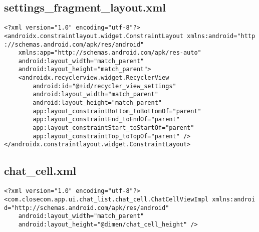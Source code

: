 \documentclass[listing]{espd}
\begin{document}
\subsection{settings\_fragment\_layout.xml}
\begin{verbatim}
<?xml version="1.0" encoding="utf-8"?>
<androidx.constraintlayout.widget.ConstraintLayout xmlns:android="http
://schemas.android.com/apk/res/android"
    xmlns:app="http://schemas.android.com/apk/res-auto"
    android:layout_width="match_parent"
    android:layout_height="match_parent">
    <androidx.recyclerview.widget.RecyclerView
        android:id="@+id/recycler_view_settings"
        android:layout_width="match_parent"
        android:layout_height="match_parent"
        app:layout_constraintBottom_toBottomOf="parent"
        app:layout_constraintEnd_toEndOf="parent"
        app:layout_constraintStart_toStartOf="parent"
        app:layout_constraintTop_toTopOf="parent" />
</androidx.constraintlayout.widget.ConstraintLayout>
\end{verbatim}

\subsection{chat\_cell.xml}
\begin{verbatim}
<?xml version="1.0" encoding="utf-8"?>
<com.closecom.app.ui.chat_list.chat_cell.ChatCellViewImpl xmlns:androi
d="http://schemas.android.com/apk/res/android"
    android:layout_width="match_parent"
    android:layout_height="@dimen/chat_cell_height" />
\end{verbatim}
\end{document}
